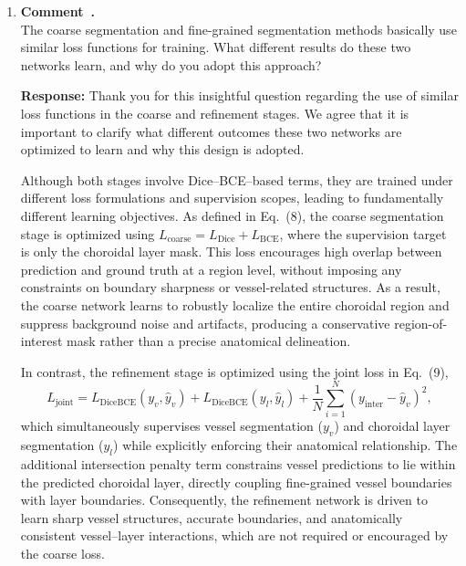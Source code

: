 \documentclass[11pt]{article}
\newcommand{\commentresponse}[2]{{\color{blue}\textbf{Response:} #2}}
\newcommand{\commentitem}{\item \textbf{Comment~\arabic{enumi}.}\\\ignorespaces}
\begin{document}
\begin{enumerate}
{    Furthermore, the Cascaded Joint Framework and the joint loss function explicitly couple the predictions of the two branches at the boundary level. This design encourages vessel predictions to be anatomically consistent with the choroidal layer, suppressing false positives outside the layer and reinforcing continuity within it. Through joint feature fusion and boundary-level constraints, the network learns not only appearance-based cues but also the inherent anatomical relationship between layers and vessels.

    In summary, the anatomical relationship is that choroidal vessels are spatially constrained and structurally dependent on the choroidal layer. The structure-aware dual-branch design captures this relationship by combining global layer context, structure-aware feature fusion, and explicit joint constraints, leading to more anatomically consistent and precise segmentation.
    }

    \commentitem The coarse segmentation and fine-grained segmentation methods basically use similar loss functions for training. What different results do these two networks learn, and why do you adopt this approach?
    
    \commentresponse{8}{
    Thank you for this insightful question regarding the use of similar loss functions in the coarse and refinement stages.
    We agree that it is important to clarify what different outcomes these two networks are optimized to learn and why this design is adopted.
    
    Although both stages involve Dice--BCE–based terms, they are trained under different loss formulations and supervision scopes, leading to fundamentally different learning objectives.
    As defined in Eq.~(8), the coarse segmentation stage is optimized using
    $L_{\text{coarse}} = L_{\text{Dice}} + L_{\text{BCE}}$,
    where the supervision target is only the choroidal layer mask.
    This loss encourages high overlap between prediction and ground truth at a region level, without imposing any constraints on boundary sharpness or vessel-related structures.
    As a result, the coarse network learns to robustly localize the entire choroidal region and suppress background noise and artifacts, producing a conservative region-of-interest mask rather than a precise anatomical delineation.
    
    In contrast, the refinement stage is optimized using the joint loss in Eq.~(9),
    \[
    L_{\text{joint}} = L_{\text{DiceBCE}}(y_v,\hat{y}_v) + L_{\text{DiceBCE}}(y_l,\hat{y}_l) + \frac{1}{N}\sum_{i=1}^{N}(y_{\text{inter}} - \hat{y}_v)^2,
    \]
    which simultaneously supervises vessel segmentation ($y_v$) and choroidal layer segmentation ($y_l$) while explicitly enforcing their anatomical relationship.
    The additional intersection penalty term constrains vessel predictions to lie within the predicted choroidal layer, directly coupling fine-grained vessel boundaries with layer boundaries.
    Consequently, the refinement network is driven to learn sharp vessel structures, accurate boundaries, and anatomically consistent vessel--layer interactions, which are not required or encouraged by the coarse loss.
    
}
\end{enumerate}
\end{document}
